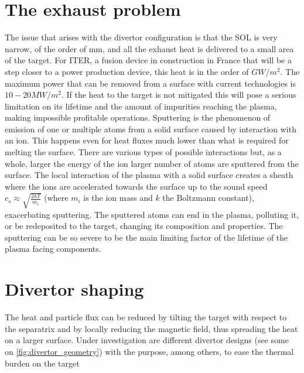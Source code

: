 \section{The exhaust problem}

The issue that arises with the divertor configuration is that the SOL is  very narrow, of the order of mm, and all the exhaust heat is delivered to a small area of the target. For ITER, a fusion device in construction in France that will be a step closer to a power production device, this heat is in the order of $GW/m^2$. The maximum power that can be removed from a surface with current technologies is $10-20MW/m^2$.\cite{Lipschultz2018} If the heat to the target is not mitigated this will pose a serious limitation on its lifetime and the amount of impurities reaching the plasma, making impossible profitable operations. 
Sputtering is the phenomenon of emission of one or multiple atoms from a solid surface caused by interaction with an ion. This happens even for heat fluxes much lower than what is required for melting the surface. There are various types of possible interactions but, as a whole, larger the energy of the ion larger number of atoms are sputtered from the surface. The local interaction of the plasma with a solid surface creates a sheath where the ions are accelerated towards the surface up to the sound speed $c_s \approx \sqrt{\frac{2kT}{m_i}}$ (where $m_i$ is the ion mass and $k$ the Boltzmann constant), exacerbating sputtering. The sputtered atoms can end in the plasma, polluting it, or be redeposited to the target, changing its composition and properties. The sputtering can be so severe to be the main limiting factor of the lifetime of the plasma facing components.

\section{Divertor shaping}

The heat and particle flux can be reduced by tilting the target with respect to the separatrix and by locally reducing the magnetic field, thus spreading the heat on a larger surface.
Under investigation are different divertor designs (see some on \autoref{fig:divertor_geometry}) with the purpose, among others, to ease the thermal burden on the target

